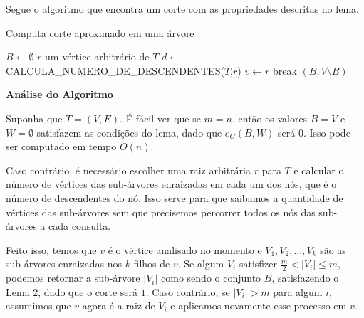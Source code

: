 \documentclass[a4paper,12pt]{article}
\begin{document}
Segue o algoritmo que encontra um corte com as propriedades descritas
no lema.

\medskip

\begin{algorithm}[H]

	\caption{Computa corte aproximado em uma árvore}
	$B \gets \emptyset$\;
	{
		$r$ um vértice arbitrário de $T$\;
		$d \gets $ CALCULA\_NUMERO\_DE\_DESCENDENTES($T$,$r$)\;
		$v \gets r$\;
		{
		{
			{
				break\;
			}
		}
		}
	}
	\Return $(B,V\setminus B)$

\end{algorithm}	

\bigskip
\bigskip

\textbf{Análise do Algoritmo}

	Suponha que $T=(V,E)$.
	É fácil ver que se $m=n$, então os valores $B = V$ e $W = \emptyset$ 
	satisfazem as condições do lema, dado que $e_G(B,W)$ será $0$. 
	Isso pode ser computado em tempo $O(n)$.

	Caso contrário, é necessário escolher uma raiz arbitrária $r$ para $T$
	e calcular o número de vértices das sub-árvores enraizadas 
	em cada um dos nós, que é o número de descendentes do nó.
	Isso serve para que saibamos a quantidade de vértices das sub-árvores
	sem que precisemos percorrer todos os nós das sub-árvores a cada consulta.

	Feito isso, temos que $v$ é o vértice analisado no momento e 
	$V_1, V_2, \ldots, V_k$ são as sub-árvores enraizadas nos $k$ filhos
	de $v$.
	Se algum $V_i$ satisfizer $\frac{m}{2}<|V_i|\le m$, podemos retornar
	a sub-árvore $|V_i|$ como sendo o conjunto $B$, satisfazendo o Lema 2,
	dado que o corte será $1$.
	Caso contrário, se $|V_i|> m$ para algum $i$, assumimos que 
	$v$ agora é a raiz de $V_i$ e aplicamos novamente esse processo em $v$.
\end{document}
